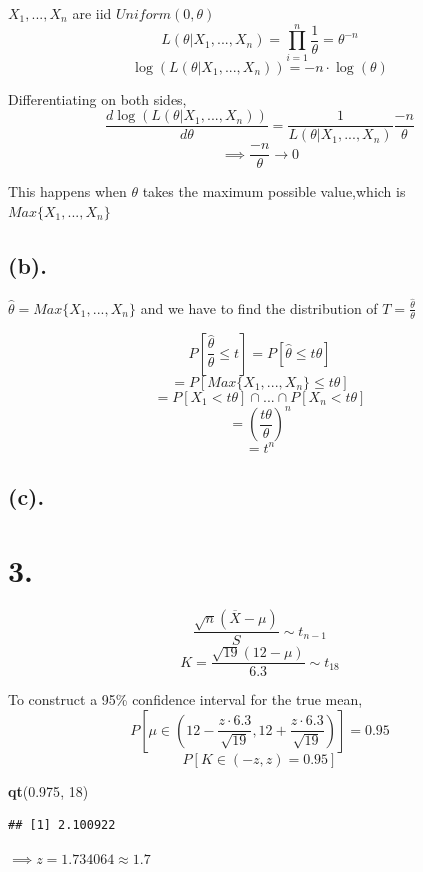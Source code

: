 \documentclass[
]{article}
\newenvironment{Shaded}{\begin{snugshade}}{\end{snugshade}}
\newcommand{\DecValTok}[1]{\textcolor[rgb]{0.00,0.00,0.81}{#1}}
\newcommand{\FloatTok}[1]{\textcolor[rgb]{0.00,0.00,0.81}{#1}}
\newcommand{\FunctionTok}[1]{\textcolor[rgb]{0.13,0.29,0.53}{\textbf{#1}}}
\newcommand{\NormalTok}[1]{#1}
\begin{document}
\(X_1, ..., X_n\) are iid \(Uniform(0,\theta)\)
\[L(\theta| X_1, ..., X_n) = \prod_{i=1}^n\frac{1}{\theta} = \theta^{-n}\]
\[\log(L(\theta| X_1, ..., X_n)) = -n\cdot \log(\theta)\]

Differentiating on both sides,
\[\frac{d\log(L(\theta| X_1, ..., X_n))}{d\theta} = \frac{1}{L(\theta| X_1, ..., X_n)}\frac{-n}{\theta}\]
\[\implies \frac{-n}{\theta} \rightarrow 0\]

This happens when \(\theta\) takes the maximum possible value,which is
\(Max\{X_1, ..., X_n\}\)

\subsection*{(b). }

\(\hat{\theta} = Max\{X_1, ..., X_n\}\) and we have to find the
distribution of \(T = \frac{ \hat{ \theta }}{ \theta }\)

\[P\left[ \frac{\hat{\theta}}{\theta} \leq t\right] = P[\hat{\theta} \leq t\theta]\]
\[ = P[Max\{X_1, ..., X_n\} \leq t\theta]\]
\[ = P[X_1 < t\theta] \cap ... \cap P[X_n < t\theta]\]
\[ = \left(\frac{t\theta}{\theta}\right)^n\] \[ = t^n\]

\subsection*{(c). }

\section*{3. }

\[\frac{\sqrt{n}(\overline{X} - \mu)}{S} \sim t_{n-1}\]
\[K = \frac{\sqrt{19}(12 - \mu)}{6.3} \sim t_{18}\]

To construct a 95\% confidence interval for the true mean,
\[P\left[\mu \in \left(12 -\frac{z\cdot6.3}{\sqrt{19}},12 +\frac{z\cdot6.3}{\sqrt{19}} \right)\right] = 0.95\]
\[P[K \in (-z,z) = 0.95]\]

\begin{Shaded}
\begin{Highlighting}[]
\FunctionTok{qt}\NormalTok{(}\FloatTok{0.975}\NormalTok{, }\DecValTok{18}\NormalTok{)}
\end{Highlighting}
\end{Shaded}

\begin{verbatim}
## [1] 2.100922
\end{verbatim}

\(\implies z = 1.734064 \approx 1.7\)
\end{document}
